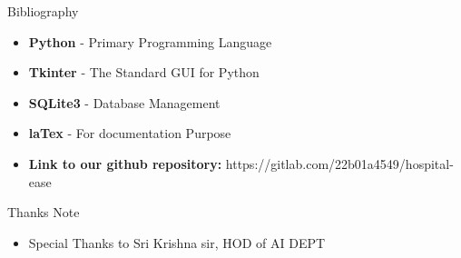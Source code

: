 \documentclass{beamer}
\begin{document}
\begin{frame}{Bibliography}
\vspace{0.8cm}
    \begin{itemize}
        \item \textbf{Python} - Primary Programming Language
        \vspace{0.4cm}
        \item \textbf{Tkinter} - The Standard GUI for Python
        \vspace{0.4cm}
        \item \textbf{SQLite3} - Database Management
        \vspace{0.4cm}
        \item \textbf{laTex} - For documentation Purpose
        \vspace{0.4cm}
        \item \textbf{Link to our github repository: }https://gitlab.com/22b01a4549/hospital-ease
        \vspace{0.8cm}
    \end{itemize}
\end{frame}
\begin{frame}{Thanks Note}
\centering
\begin{itemize}
    \item Special Thanks to Sri Krishna sir, HOD of AI DEPT
\end{itemize}

    
\end{frame}
\end{document}
